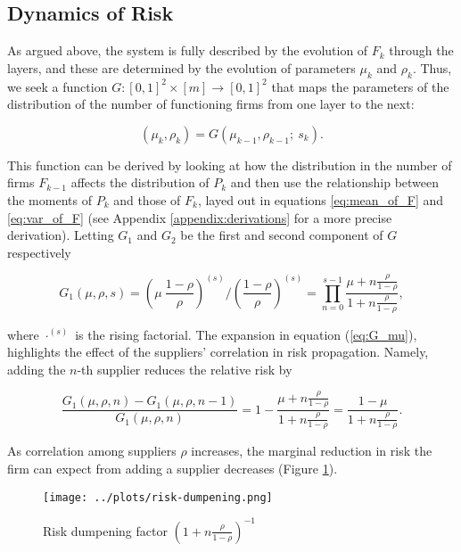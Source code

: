 \documentclass[../../main.tex]{subfiles}
\begin{document}
\subsection{Dynamics of Risk}

As argued above, the system is fully described by the evolution of $F_k$ through the layers, and these are determined by the evolution of parameters $\mu_k$ and $\rho_k$. Thus, we seek a function $G: [0, 1]^2 \times [m] \to [0, 1]^2$ that maps the parameters of the distribution of the number of functioning firms from one layer to the next:

\begin{equation}
  (\mu_k, \rho_k) = G(\mu_{k - 1}, \rho_{k - 1}; \ s_k).
\end{equation}

This function can be derived by looking at how the distribution in the number of firms $F_{k - 1}$ affects the distribution of $P_k$ and then use the relationship between the moments of $P_k$ and those of $F_k$, layed out in equations \ref{eq:mean_of_F} and \ref{eq:var_of_F} (see Appendix \ref{appendix:derivations} for a more precise derivation). Letting $G_1$ and $G_2$ be the first and second component of $G$ respectively

\begin{equation} \label{eq:G_mu}
  G_1(\mu, \rho, s) = \left( \mu \  \frac{1 - \rho}{\rho} \right)^{(s)} \Big/ \left(\frac{1 - \rho}{\rho} \right)^{(s)} = \prod^{s - 1}_{n = 0} \frac{\mu + n \frac{\rho}{1 - \rho}}{1 + n \frac{\rho}{1 - \rho}},
\end{equation}

where $\cdot^{(s)}$ is the rising factorial. The expansion in equation (\ref{eq:G_mu}), highlights the effect of the suppliers' correlation in risk propagation. Namely, adding the $n$-th supplier reduces the relative risk by

\begin{equation}
  \frac{G_1(\mu, \rho, n) - G_1(\mu, \rho, n - 1)}{G_1(\mu, \rho, n)} = 1 - \frac{\mu + n \frac{\rho}{1 - \rho}}{1 + n \frac{\rho}{1 - \rho}} = \frac{1 - \mu}{1 + n \frac{\rho}{1 - \rho}}.
\end{equation}

As correlation among suppliers $\rho$ increases, the marginal reduction in risk the firm can expect from adding a supplier decreases (Figure \ref{fig:risk-dumpening}).


\begin{figure}[H]
  \centering
  \texttt{[image: ../plots/risk-dumpening.png]}
  \caption{Risk dumpening factor $\left(1 + n \frac{\rho}{1 - \rho}\right)^{-1}$}
  \label{fig:risk-dumpening}
\end{figure}
\end{document}
